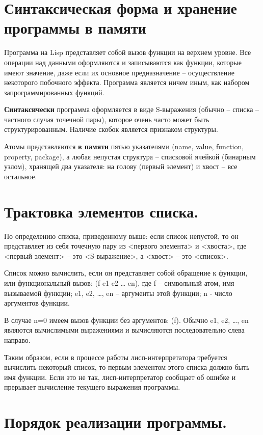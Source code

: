 \documentclass[12pt]{report}
\begin{document}
\section*{Синтаксическая форма и хранение программы в памяти}

Программа на Lisp представляет собой вызов функции на верхнем уровне. Все операции над данными оформляются и  записываются как функции, которые имеют значение, даже если их основное предназначение – осуществление некоторого побочного эффекта. Программа является ничем иным, как набором запрограммированных функций.

\textbf{Синтаксически} программа оформляется в виде S-выражения (обычно -- списка -- частного случая точечной пары), которое очень часто может быть структурированным. Наличие скобок является признаком структуры. 



Атомы представляются \textbf{в памяти} пятью указателями  (name, value, function, property, package), а любая непустая структура --  списковой ячейкой (бинарным узлом), хранящей два указателя: на голову (первый элемент) и хвост -- все остальное.


\section*{Трактовка элементов списка.}

По определению списка, приведенному выше: если список непустой, то он представляет из себя точечную пару из  <первого элемента> и <хвоста>, где <первый элемент> -- это <S-выражение>, а <хвост> -- это <список>.

Список можно вычислить, если он представляет собой обращение к  функции, или функциональный вызов: (f e1 e2 … en), где f – символьный атом, имя вызываемой функции; e1, e2, …, en – аргументы этой функции; n - число аргументов функции.

В случае n=0 имеем вызов функции без аргументов: (f). Обычно e1, e2, …, en являются вычислимыми выражениями и вычисляются последовательно слева направо.

Таким образом, если в процессе работы лисп-интерпретатора  требуется вычислить некоторый список, то первым элементом этого   списка должно быть имя функции. Если это не так, лисп-интерпретатор  сообщает об ошибке и прерывает вычисление текущего выражения  программы.


\section*{Порядок реализации программы.}
\end{document}
